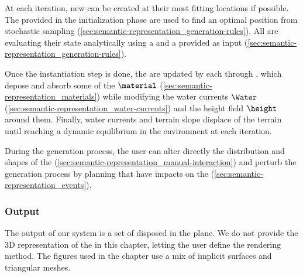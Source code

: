 At each iteration, new  can be created at their most fitting locations if possible. The  provided in the initialization phase are used to find an optimal position from stochastic sampling (\cref{sec:semantic-representation_generation-rules}). 
All  are evaluating their state analytically using a  and a  provided as input (\cref{sec:semantic-representation_generation-rules}).

Once the instantiation step is done, the  are updated by each  through , which depose and absorb some of the  $\material$ (\cref{sec:semantic-representation_materials}) while modifying the water currents $\Water$ (\cref{sec:semantic-representation_water-currents}) and the height field $\height$ around them. Finally, water currents and terrain slope displace  of the terrain until reaching a dynamic equilibrium in the environment at each iteration.

During the generation process, the user can alter directly the distribution and shapes of the  (\cref{sec:semantic-representation_manual-interaction}) and perturb the generation process by planning  that have impacts on the  (\cref{sec:semantic-representation_events}).


\subsubsection{Output}
The output of our system is a set of  disposed in the plane. We do not provide the 3D representation of the  in this chapter, letting the user define the rendering method. The figures used in the chapter use a mix of implicit surfaces and triangular meshes.

